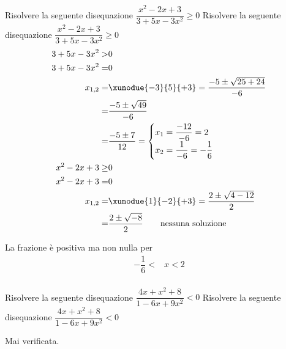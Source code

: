 \begin{exercise}
		Risolvere la seguente disequazione $\dfrac{x^2-2x+3}{3+5x-3x^2}\geq 0$
\tcblower
Risolvere la seguente disequazione $\dfrac{x^2-2x+3}{3+5x-3x^2}\geq 0$
\begin{align*}
3+5x-3x^2>&0\\
3+5x-3x^2=&0\\
x_{1,2}=&\xunodue{-3}{5}{+3}=\dfrac{-5\pm\sqrt{25+24}}{-6}\\
=&\dfrac{-5\pm\sqrt{49}}{-6}\\
=&\dfrac{-5\pm 7}{12}=\begin{cases}
x_1=\dfrac{-12}{-6}=2\\
x_2=\dfrac{1}{-6}=-\dfrac{1}{6}
\end{cases}\\
x^2-2x+3\geq&0\\
x^2-2x+3=&0\\
x_{1,2}=&\xunodue{1}{-2}{+3}=\dfrac{2\pm\sqrt{4-12}}{2}\\
=&\dfrac{2\pm\sqrt{-8}}{2}
\qquad\text{nessuna soluzione}\\
\end{align*}
\begin{center}
	
\end{center}
La frazione è positiva ma non nulla per 
\begin{align*}
-\dfrac{1}{6}<&x<2\\
\end{align*}
\end{exercise}
\begin{exercise}
		Risolvere la seguente disequazione $\dfrac{4x+x^2+8}{1-6x+9x^2}< 0$
	\tcblower
	Risolvere la seguente disequazione $\dfrac{4x+x^2+8}{1-6x+9x^2}< 0$
	
	Mai verificata.
\end{exercise}
